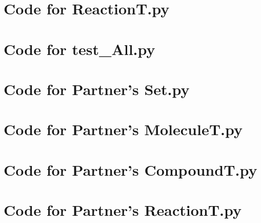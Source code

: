 \documentclass[12pt]{article}
\begin{document}
\newpage

\section{Code for ReactionT.py}

\noindent 

\newpage

\section{Code for test\_All.py}

\noindent 

\newpage

\section{Code for Partner's Set.py}

\noindent 

\newpage

\section{Code for Partner's MoleculeT.py}

\noindent 

\newpage

\section{Code for Partner's CompoundT.py}

\noindent 

\newpage

\section{Code for Partner's ReactionT.py}

\noindent 
\end{document}
